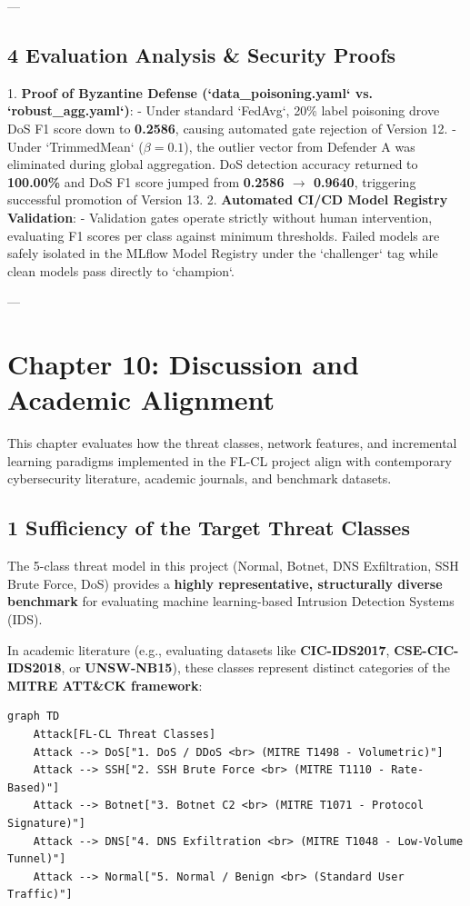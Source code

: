 \documentclass[conference]{IEEEtran}
\begin{document}
---


\subsection{4 Evaluation Analysis & Security Proofs}

1. \textbf{Proof of Byzantine Defense (`data\_poisoning.yaml` vs. `robust\_agg.yaml`)}:
   - Under standard `FedAvg`, 20\% label poisoning drove DoS F1 score down to \textbf{0.2586}, causing automated gate rejection of Version 12.
   - Under `TrimmedMean` ($\beta=0.1$), the outlier vector from Defender A was eliminated during global aggregation. DoS detection accuracy returned to \textbf{100.00\%} and DoS F1 score jumped from \textbf{0.2586 $\rightarrow$ 0.9640}, triggering successful promotion of Version 13.
2. \textbf{Automated CI/CD Model Registry Validation}:
   - Validation gates operate strictly without human intervention, evaluating F1 scores per class against minimum thresholds. Failed models are safely isolated in the MLflow Model Registry under the `challenger` tag while clean models pass directly to `champion`.

---


\section{Chapter 10: Discussion and Academic Alignment}

This chapter evaluates how the threat classes, network features, and incremental learning paradigms implemented in the FL-CL project align with contemporary cybersecurity literature, academic journals, and benchmark datasets.


\subsection{1 Sufficiency of the Target Threat Classes}

The 5-class threat model in this project (Normal, Botnet, DNS Exfiltration, SSH Brute Force, DoS) provides a \textbf{highly representative, structurally diverse benchmark} for evaluating machine learning-based Intrusion Detection Systems (IDS). 

In academic literature (e.g., evaluating datasets like \textbf{CIC-IDS2017}, \textbf{CSE-CIC-IDS2018}, or \textbf{UNSW-NB15}), these classes represent distinct categories of the \textbf{MITRE ATT\&CK framework}:

\begin{verbatim}
graph TD
    Attack[FL-CL Threat Classes]
    Attack --> DoS["1. DoS / DDoS <br> (MITRE T1498 - Volumetric)"]
    Attack --> SSH["2. SSH Brute Force <br> (MITRE T1110 - Rate-Based)"]
    Attack --> Botnet["3. Botnet C2 <br> (MITRE T1071 - Protocol Signature)"]
    Attack --> DNS["4. DNS Exfiltration <br> (MITRE T1048 - Low-Volume Tunnel)"]
    Attack --> Normal["5. Normal / Benign <br> (Standard User Traffic)"]
\end{verbatim}
\end{document}
